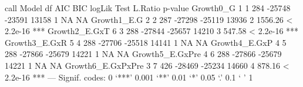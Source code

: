                     call  Model     df    AIC    BIC logLik   Test L.Ratio   p-value    
Growth0_G              1      1    284 -25748 -23591  13158      1      NA        NA    
Growth1_E.G            2      2    287 -27298 -25119  13936      2 1556.26 < 2.2e-16 ***
Growth2_E.GxT          6      3    288 -27844 -25657  14210      3  547.58 < 2.2e-16 ***
Growth3_E.GxR          5      4    288 -27706 -25518  14141      1      NA        NA    
Growth4_E.GxP          4      5    288 -27866 -25679  14221      1      NA        NA    
Growth5_E.GxPre        4      6    288 -27866 -25679  14221      1      NA        NA    
Growth6_E.GxPxPre      3      7    426 -28469 -25234  14660      4  878.16 < 2.2e-16 ***
---
Signif. codes:  0 ‘***’ 0.001 ‘**’ 0.01 ‘*’ 0.05 ‘.’ 0.1 ‘ ’ 1
